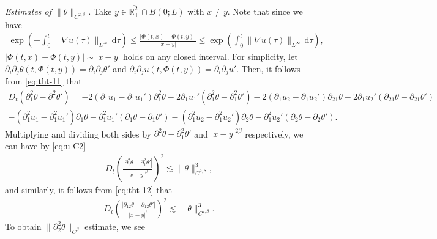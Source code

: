 \documentclass[10pt]{amsart}
\theoremstyle{definition}
\theoremstyle{remark}
\numberwithin{equation}{section}
\newcommand{\ud}{\mathrm{d}}
\newcommand{\rd}{\partial}
\newcommand{\0}{\emptyset}
\newcommand{\ohp}{\overline{\bbR^2_+}}
\newcommand{\bt}{\beta}
\newcommand{\tht}{\theta}
\newcommand{\bbR}{\mathbb R}
\begin{document}
		\noindent \textit{Estimates of $\| \tht \|_{C^{2,\beta}}$.} Take $y \in \ohp \cap B(0;L)$ with $x \neq y$. Note that since we have \begin{equation}\label{eq:flow-lip}
			\begin{split}
				\exp{\left( -\int_0^t \| \nabla u(\tau) \|_{L^{\infty}} \,\ud \tau \right)} {\leq} \frac{|\Phi(t,x) - \Phi(t,y)|}{|x-y|} {\leq} \exp{\left( \int_0^t \| \nabla u(\tau) \|_{L^{\infty}} \,\ud \tau \right)},
			\end{split}
		\end{equation} $|\Phi(t,x) - \Phi(t,y)| \sim |x-y|$ holds on any closed interval. For simplicity, let $\partial_i \partial_j \tht(t,\Phi(t,y)) = \partial_i \partial_j \tht'$ and $\partial_i\partial_ju(t,\Phi(t,y)) = \partial_i\partial_ju'$. Then, it follows from \eqref{eq:tht-11} that \begin{equation*}
			\begin{gathered}
				D_t(\partial_1^2\tht - \partial_1^2\tht') = -2 (\partial_1u_1 - \partial_1u_1')\partial_1^2\tht -2 \partial_1u_1'(\partial_1^2 \tht - \partial_1^2 \tht') - 2(\rd_{1}u_{2} - \rd_{1}u_{2}')\rd_{21}\tht - 2\rd_{1}u_{2}' (\rd_{21}\tht - \rd_{21}\tht') \\
				- (\rd_{1}^{2} u_1 - \rd_1^2 u_1') \rd_1\tht - \rd_{1}^{2} u_1' (\rd_1\tht - \rd_1 \tht') - (\rd_{1}^{2}u_2 - \rd_{1}^{2}u_2') \rd_2\tht - \rd_{1}^{2}u_2' (\rd_2\tht -\rd_2\tht').
			\end{gathered}
		\end{equation*} Multiplying and dividing both sides by $\partial_1^2\tht - \partial_1^2\tht'$ and $|x-y|^{2\beta}$ respectively, we can have by \eqref{eq:u-C2} \begin{equation*}
			\begin{gathered}
				D_t\left( \frac{|\partial_1^2\tht - \partial_1^2\tht'|}{|x-y|^{\bt}} \right)^2 \lesssim \| \tht \|_{C^{2,\beta}}^3,
			\end{gathered}
		\end{equation*} and similarly, it follows from \eqref{eq:tht-12} that \begin{equation*}
			\begin{split}
				D_t\left( \frac{|\partial_{12}\tht - \partial_{12}\tht'|}{|x-y|^{\bt}} \right)^2 \lesssim \| \tht \|_{C^{2,\beta}}^3.
			\end{split}
		\end{equation*} To obtain $\| \partial_2^2 \tht \|_{C^\beta}$ estimate, we see \begin{equation*}
			\begin{gathered}

\end{gathered}
\end{equation*}
\end{document}
